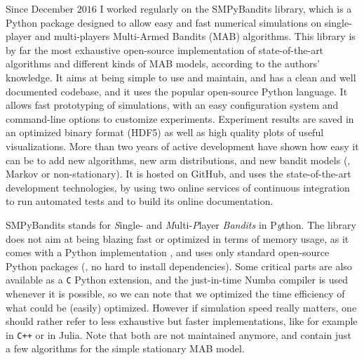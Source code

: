 Since December $2016$ I worked regularly on the SMPyBandits library, which is a Python package  designed to allow easy and fast numerical simulations on single-player and multi-players Multi-Armed Bandits (MAB) algorithms.
%
This library is by far the most exhaustive open-source implementation of state-of-the-art algorithms and different kinds of MAB models, according to the authors' knowledge.
It aims at being simple to use and maintain, and has a clean and well documented codebase, and it uses the popular open-source Python language.
It allows fast prototyping of simulations, with an easy configuration system and command-line options to customize experiments.
Experiment results are saved in an optimized binary format (HDF5) as well as high quality plots of useful visualizations.
%
More than two years of active development have shown how easy it can be to add new algorithms, new arm distributions, and new bandit models (\eg, Markov or non-stationary).
It is hosted on GitHub, and uses the state-of-the-art development technologies, by using two online services of continuous integration to run automated tests and to build its online documentation.

SMPyBandits stands for \emph{S}ingle- and \emph{M}ulti-\emph{P}layer \emph{Bandits} in P\emph{y}thon.
The library does not aim at being blazing fast or optimized in terms of memory usage, as it comes with a Python implementation \cite{python}, and uses only standard open-source Python packages (\ie, no hard to install dependencies).
Some critical parts are also available as a \texttt{C} Python extension, and the just-in-time Numba compiler \cite{numba} is used whenever it is possible, so we can note that we optimized the time efficiency of what could be (easily) optimized.
However if simulation speed really matters, one should rather refer to less exhaustive but faster implementations, like for example \cite{TorLibbandit} in \texttt{C++} or \cite{VishMABjl} in Julia. Note that both are not maintained anymore, and contain just a few algorithms for the simple stationary MAB model.

